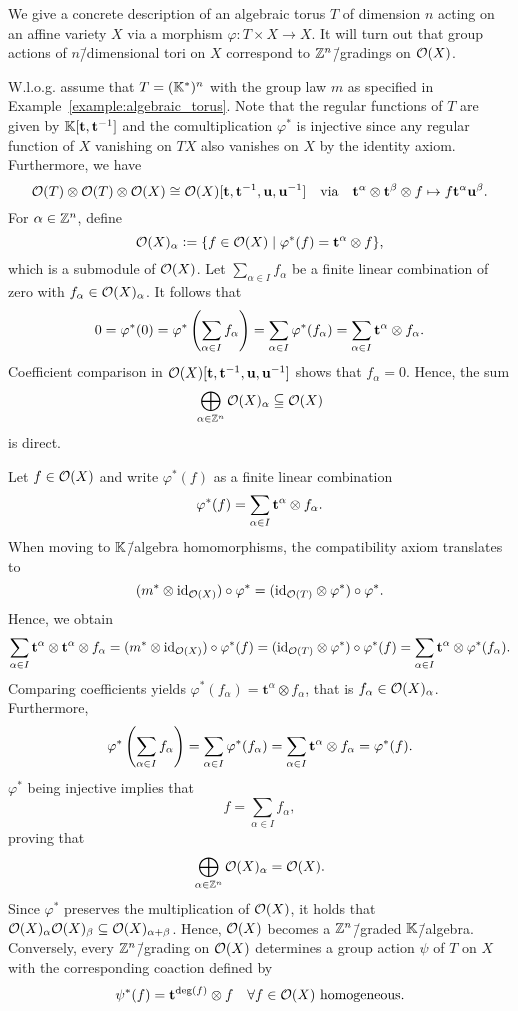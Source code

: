 \begin{construction}
	\label{construction:algebraic_torus}
	We give a concrete description of an algebraic torus $T$ of dimension $n$ acting on an affine variety $X$ via a morphism $\varphi\colon T\times X \rightarrow X$. It will turn out that group actions of $n$\=/dimensional tori on $X$ correspond to $\mathbb{Z}^n$\=/gradings on $\mathcal{O}(X)$.
	
	W.l.o.g. assume that $T = (\mathbb{K}^*)^n$ with the group law $m$ as specified in Example~\ref{example:algebraic_torus}. Note that the regular functions of $T$ are given by $\mathbb{K}[\mathbf{t},\mathbf{t}^{-1}]$ and the comultiplication $\varphi^*$ is injective since any regular function of $X$ vanishing on $TX$ also vanishes on $X$ by the identity axiom. Furthermore, we have $$\mathcal{O}(T)\otimes\mathcal{O}(T)\otimes\mathcal{O}(X)\cong\mathcal{O}(X)[\mathbf{t},\mathbf{t}^{-1},\mathbf{u},\mathbf{u}^{-1}]\quad\text{via}\quad\mathbf{t}^\alpha \otimes \mathbf{t}^\beta \otimes f \mapsto f\mathbf{t}^\alpha\mathbf{u}^\beta.$$
	For $\alpha\in\mathbb{Z}^n$, define
	$$\mathcal{O}(X)_\alpha \mathrel{\mathop:}= \{f\in\mathcal{O}(X)\mid \varphi^*(f) = \mathbf{t}^\alpha \otimes f\},$$
	which is a submodule of $\mathcal{O}(X)$. Let $\sum_{\alpha\in I} f_\alpha$ be a finite linear combination of zero with $f_\alpha\in\mathcal{O}(X)_\alpha$. It follows that
	$$0 = \varphi^*(0) = \varphi^*\left(\sum_{\alpha\in I} f_\alpha\right) = \sum_{\alpha\in I} \varphi^*(f_\alpha) = \sum_{\alpha\in I} \mathbf{t}^\alpha \otimes f_\alpha.$$
	Coefficient comparison in $\mathcal{O}(X)[\mathbf{t},\mathbf{t}^{-1},\mathbf{u},\mathbf{u}^{-1}]$ shows that $f_\alpha = 0$. Hence, the sum
	$$\bigoplus_{\alpha\in\mathbb{Z}^n} \mathcal{O}(X)_\alpha \subseteqq \mathcal{O}(X)$$
	is direct.

	Let $f\in \mathcal{O}(X)$ and write $\varphi^*(f)$ as a finite linear combination
	$$\varphi^*(f) = \sum_{\alpha\in I} \mathbf{t}^\alpha \otimes f_\alpha.$$
	When moving to $\mathbb{K}$\=/algebra homomorphisms, the compatibility axiom translates to
	$$(m^* \otimes \text{id}_{\mathcal{O}(X)}) \circ \varphi^* = (\text{id}_{\mathcal{O}(T)} \otimes \varphi^*) \circ \varphi^*.$$
	Hence, we obtain
	$$\sum_{\alpha\in I} \mathbf{t}^\alpha \otimes \mathbf{t}^\alpha \otimes f_\alpha = (m^* \otimes \text{id}_{\mathcal{O}(X)}) \circ \varphi^*(f) =  (\text{id}_{\mathcal{O}(T)} \otimes \varphi^*) \circ \varphi^*(f) = \sum_{\alpha\in I}\mathbf{t}^\alpha \otimes \varphi^*(f_\alpha).$$
	Comparing coefficients yields $\varphi^*(f_\alpha) = \mathbf{t}^\alpha \otimes f_\alpha$, that is $f_\alpha\in \mathcal{O}(X)_\alpha$. Furthermore,
	$$\varphi^*\left(\sum_{\alpha\in I} f_\alpha\right) = \sum_{\alpha\in I} \varphi^*(f_\alpha) = \sum_{\alpha\in I} \mathbf{t}^\alpha \otimes f_\alpha = \varphi^*(f).$$
	$\varphi^*$ being injective implies that
	$$f = \sum_{\alpha\in I} f_\alpha,$$
	proving that
	$$\bigoplus_{\alpha\in\mathbb{Z}^n} \mathcal{O}(X)_\alpha = \mathcal{O}(X).$$
	Since $\varphi^*$ preserves the multiplication of $\mathcal{O}(X)$, it holds that $\mathcal{O}(X)_\alpha \mathcal{O}(X)_\beta \subseteq \mathcal{O}(X)_{\alpha+\beta}$. Hence, $\mathcal{O}(X)$ becomes a $\mathbb{Z}^n$\=/graded $\mathbb{K}$\=/algebra. Conversely, every $\mathbb{Z}^n$\=/grading on $\mathcal{O}(X)$ determines a group action $\psi$ of $T$ on $X$ with the corresponding coaction defined by 
	$$\psi^*(f) = \mathbf{t}^{\deg(f)}\otimes f\quad \forall f\in\mathcal{O}(X)\ \mathrm{homogeneous}.$$
	

\end{construction}
